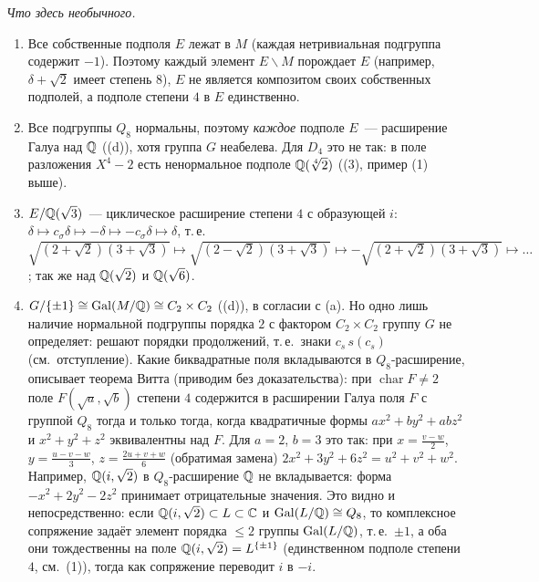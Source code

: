 \emph{Что здесь необычного.}
\begin{enumerate}[label=(\arabic*),leftmargin=*]
\item Все собственные подполя $E$ лежат в $M$ (каждая нетривиальная подгруппа содержит $-1$). Поэтому каждый элемент
$E\smallsetminus M$ порождает $E$ (например, $\delta+\sqrt2$ имеет степень $8$), $E$ не является композитом своих собственных
подполей, а подполе степени $4$ в $E$ единственно.
\item Все подгруппы $Q_8$ нормальны, поэтому \emph{каждое} подполе $E$~--- расширение Галуа над $\mathbb Q$ ((d)), хотя
группа $G$ неабелева. Для $D_4$ это не так: в поле разложения $X^4-2$ есть ненормальное подполе $\mathbb Q(\sqrt[4]2)$ ((3), пример (1)
выше).
\item $E/\mathbb Q(\sqrt3)$~--- циклическое расширение степени $4$ с образующей $i$:
$\delta\mapsto c_\sigma\delta\mapsto-\delta\mapsto-c_\sigma\delta\mapsto\delta$, т.\,е.\
$\sqrt{(2+\sqrt2)(3+\sqrt3)}\mapsto\sqrt{(2-\sqrt2)(3+\sqrt3)}\mapsto-\sqrt{(2+\sqrt2)(3+\sqrt3)}\mapsto\dots$; так же над
$\mathbb Q(\sqrt2)$ и $\mathbb Q(\sqrt6)$.
\item $G/\{\pm1\}\cong\operatorname{Gal}(M/\mathbb Q)\cong C_2\times C_2$ ((d)), в согласии с (a). Но одно лишь наличие нормальной
подгруппы порядка $2$ с фактором $C_2\times C_2$ группу $G$ не определяет: решают порядки продолжений, т.\,е.\ знаки
$c_s\,s(c_s)$ (см.\ отступление). Какие биквадратные поля вкладываются в $Q_8$-расширение, описывает теорема Витта
(приводим без доказательства): при $\operatorname{char}F\ne2$ поле $F(\sqrt a,\sqrt b)$ степени $4$ содержится в
расширении Галуа поля $F$ с группой $Q_8$ тогда и только тогда, когда квадратичные формы $ax^2+by^2+abz^2$ и
$x^2+y^2+z^2$ эквивалентны над $F$. Для $a=2$, $b=3$ это так: при $x=\frac{v-w}2$, $y=\frac{u-v-w}3$, $z=\frac{2u+v+w}6$
(обратимая замена) $2x^2+3y^2+6z^2=u^2+v^2+w^2$. Например, $\mathbb Q(i,\sqrt2)$ в $Q_8$-расширение $\mathbb Q$ не вкладывается: форма
$-x^2+2y^2-2z^2$ принимает отрицательные значения. Это видно и непосредственно: если $\mathbb Q(i,\sqrt2)\subset L\subset\mathbb C$ и
$\operatorname{Gal}(L/\mathbb Q)\cong Q_8$, то комплексное сопряжение задаёт элемент порядка $\le2$ группы $\operatorname{Gal}(L/\mathbb Q)$, т.\,е.\ $\pm1$, а оба
они тождественны на поле $\mathbb Q(i,\sqrt2)=L^{\{\pm1\}}$ (единственном подполе степени $4$, см.\ (1)), тогда как сопряжение
переводит $i$ в $-i$.
\end{enumerate}

